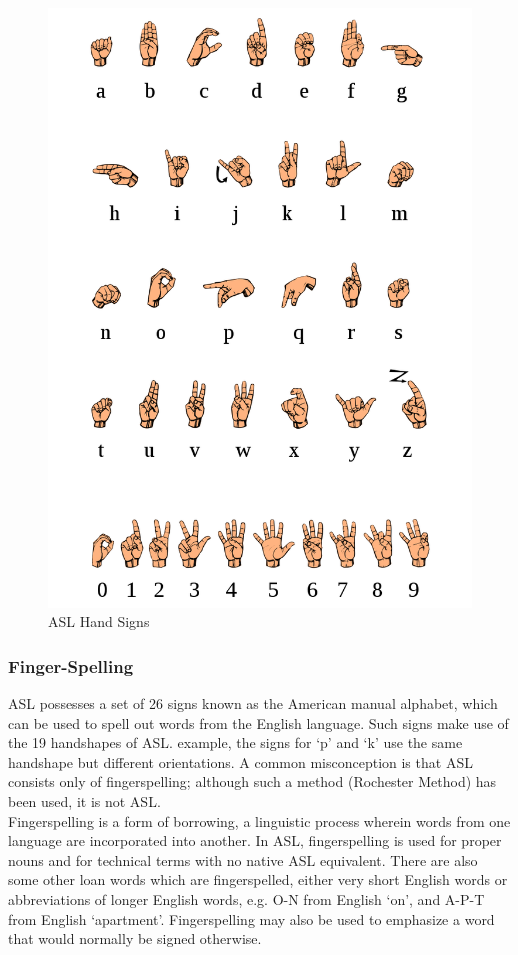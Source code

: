 \documentclass[14pt]{report}
\begin{document}
				\begin{figure}[h]
					\includegraphics[width=12cm]{ASL Signs.png}
					\centering
					\caption{ASL Hand Signs}
					\label{fig:ASLHandSign}
				\end{figure}

				\subsubsection{Finger-Spelling}
					ASL possesses a set of 26 signs known as the American manual alphabet, which can be used to spell out words from the English language. Such signs make use of the 19 handshapes of ASL.  example, the signs for `p' and `k' use the same handshape but different orientations. A common misconception is that ASL consists only of fingerspelling; although such a method (Rochester Method) has been used, it is not ASL.\\

					Fingerspelling is a form of borrowing, a linguistic process wherein words from one language are incorporated into another. In ASL, fingerspelling is used for proper nouns and for technical terms with no native ASL equivalent. There are also some other loan words which are fingerspelled, either very short English words or abbreviations of longer English words, e.g. O-N from English `on', and A-P-T from English `apartment'. Fingerspelling may also be used to emphasize a word that would normally be signed otherwise.\\
				
\end{document}
